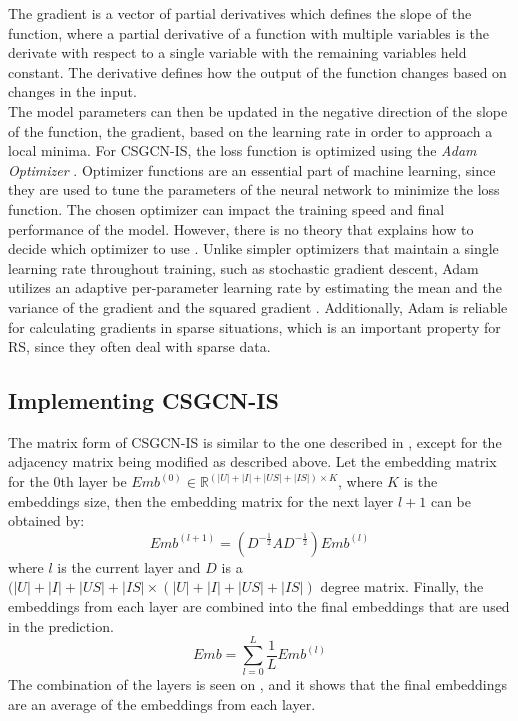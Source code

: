 The gradient is a vector of partial derivatives which defines the slope of the function, where a partial derivative of a function with multiple variables is the derivate with respect to a single variable with the remaining variables held constant.
The derivative defines how the output of the function changes based on changes in the input.\\
The model parameters can then be updated in the negative direction of the slope of the function, the gradient, based on the learning rate in order to approach a local minima. 
For CSGCN-IS, the loss function is optimized using the \textit{Adam Optimizer} \cite{AdamOptimizer}.
Optimizer functions are an essential part of machine learning, since they are used to tune the parameters of the neural network to minimize the loss function.
The chosen optimizer can impact the training speed and final performance of the model.
However, there is no theory that explains how to decide which optimizer to use \cite{EmpiricalOptimizers}.
Unlike simpler optimizers that maintain a single learning rate throughout training, such as stochastic gradient descent, Adam utilizes an adaptive per-parameter learning rate by estimating the mean and the variance of the gradient and the squared gradient \cite{AdamOptimizer}.
Additionally, Adam is reliable for calculating gradients in sparse situations, which is an important property for RS, since they often deal with sparse data.

\subsection{Implementing CSGCN-IS}
The matrix form of CSGCN-IS is similar to the one described in \cite{LightGCN}, except for the adjacency matrix being modified as described above.
Let the embedding matrix for the 0th layer be $Emb^{(0)} \in \mathbb{R}^{(|U| + |I| + |US| + |IS|) \times K}$, where $K$ is the embeddings size, then the embedding matrix for the next layer $l+1$ can be obtained by:
\begin{equation}
    Emb^{(l+1)} = (D^{-\frac{1}{2}}AD^{-\frac{1}{2}})Emb^{(l)}
\end{equation}
where $l$ is the current layer and $D$ is a $(|U| + |I| + |US| + |IS| \times (|U| + |I| + |US| + |IS|)$ degree matrix. 
Finally, the embeddings from each layer are combined into the final embeddings that are used in the prediction.
\begin{equation}\label{eq:layer_comb}
    Emb = \sum_{l=0}^{L} \frac{1}{L} Emb^{(l)}
\end{equation}
The combination of the layers is seen on , and it shows that the final embeddings are an average of the embeddings from each layer.

